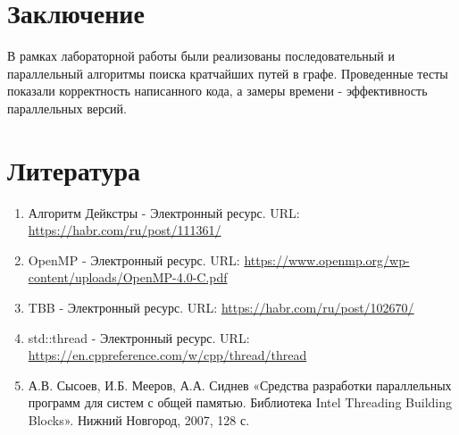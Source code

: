 \documentclass{report}
\begin{document}
\section*{Заключение}
В рамках лабораторной работы были реализованы последовательный и параллельный алгоритмы поиска кратчайших путей в графе. Проведенные тесты показали корректность написанного кода, а замеры времени - эффективность параллельных версий.
\newpage

\section*{Литература}
\begin{enumerate}
\item Алгоритм Дейкстры - Электронный ресурс. URL: \newline \url{https://habr.com/ru/post/111361/}
\item OpenMP - Электронный ресурс. URL: \newline \url{https://www.openmp.org/wp-content/uploads/OpenMP-4.0-C.pdf}
\item TBB - Электронный ресурс. URL: \newline \url{https://habr.com/ru/post/102670/}
\item std::thread - Электронный ресурс. URL: \newline \url{https://en.cppreference.com/w/cpp/thread/thread}
\item А.В. Сысоев, И.Б. Мееров, А.А. Сиднев «Средства разработки параллельных программ для систем с общей памятью. Библиотека Intel Threading Building Blocks». Нижний Новгород, 2007, 128 с.
\end{enumerate} 
\newpage

\end{document}
